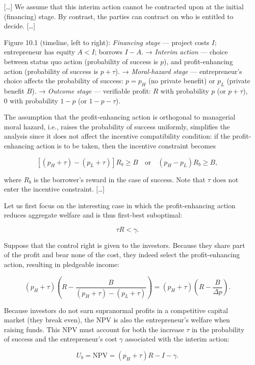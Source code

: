 \documentclass[11pt,a4paper]{article}
\begin{document}
{[}\ldots{]} We assume that this interim action cannot be contracted upon at the initial (financing)
stage. By contrast, the parties can contract on who is entitled to decide. {[}\ldots{]}

Figure 10.1 (timeline, left to right): \emph{Financing stage} --- project costs \(I\); entrepreneur
has equity \(A < I\); borrows \(I - A\). → \emph{Interim action} --- choice between status quo
action (probability of success is \(p\)), and profit-enhancing action (probability of success is
\(p + \tau\)). → \emph{Moral-hazard stage} --- entrepreneur's choice affects the probability of
success: \(p = p_H\) (no private benefit) or \(p_L\) (private benefit \(B\)). → \emph{Outcome stage}
--- verifiable profit: \(R\) with probability \(p\) (or \(p + \tau\)), 0 with probability \(1 - p\)
(or \(1 - p - \tau\)).

The assumption that the profit-enhancing action is orthogonal to managerial moral hazard, i.e.,
raises the probability of success uniformly, simplifies the analysis since it does not affect the
incentive compatibility condition: if the profit-enhancing action is to be taken, then the incentive
constraint becomes

\[[(p_H + \tau) - (p_L + \tau)]R_b \geqslant B \quad\text{or}\quad (p_H - p_L)R_b \geqslant B,\]

where \(R_b\) is the borrower's reward in the case of success. Note that \(\tau\) does not enter the
incentive constraint. {[}\ldots{]}

Let us first focus on the interesting case in which the profit-enhancing action reduces aggregate
welfare and is thus first-best suboptimal:

\[\tau R < \gamma.\]

Suppose that the control right is given to the investors. Because they share part of the profit and
bear none of the cost, they indeed select the profit-enhancing action, resulting in pledgeable
income:

\[(p_H + \tau)\left(R - \frac{B}{(p_H + \tau) - (p_L + \tau)}\right) = (p_H + \tau)\left(R - \frac{B}{\Delta p}\right).\]

Because investors do not earn supranormal profits in a competitive capital market (they break even),
the NPV is also the entrepreneur's welfare when raising funds. This NPV must account for both the
increase \(\tau\) in the probability of success and the entrepreneur's cost \(\gamma\) associated
with the interim action:

\[U_b = \text{NPV} = (p_H + \tau)R - I - \gamma.\]
\end{document}
